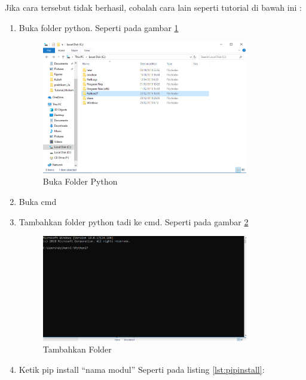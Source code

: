 Jika cara tersebut tidak berhasil, cobalah cara lain seperti tutorial di bawah ini :
\begin{enumerate}
\item Buka folder python.
Seperti pada gambar \ref{fig:bukafolder}
\begin{figure}[!htbp]
	\centerline{\includegraphics[width=0.85\textwidth]{figures/3/bukafolder.PNG}}
	\caption{Buka Folder Python}
	\label{fig:bukafolder}
\end{figure}

\item Buka cmd
\item Tambahkan folder python tadi ke cmd.
Seperti pada gambar \ref{fig:tambahfolder}
\begin{figure}[!htbp]
	\centerline{\includegraphics[width=0.85\textwidth]{figures/3/tambahfolder.PNG}}
	\caption{Tambahkan Folder}
	\label{fig:tambahfolder}
\end{figure}

\item Ketik pip install “nama modul”
Seperti pada listing \ref{lst:pipinstall}:



\end{enumerate}
